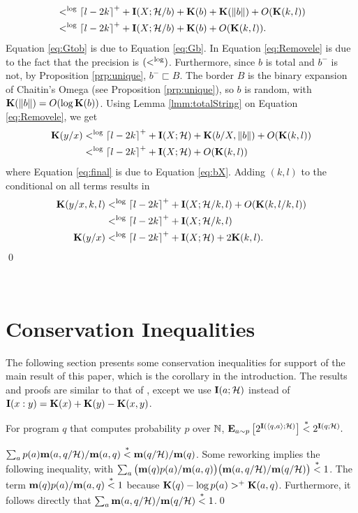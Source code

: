 \documentclass[11pt]{article}\textwidth 6.5in\textheight 9in
\begin{document}
\begin{prf}
\begin{align}
	& <^{\log} {\lceil l-2k\rceil}^++{\mathbf I}(X;{\mathcal H}/b)+{\mathbf K}(b)+{\mathbf K}(\|b\|)+O({\mathbf K}(k,l))\\
	\label{eq:Removele}
	& <^{\log} {\lceil l-2k\rceil}^++{\mathbf I}(X;{\mathcal H}/b)+{\mathbf K}(b)+O({\mathbf K}(k,l)).
	\end{align}
	Equation \ref{eq:Gtob} is due to Equation \ref{eq:Gb}. In Equation \ref{eq:Removele} is due to the fact that the precision is  $(<^{\log})$. Furthermore, since $b$ is total and $b^-$ is not, by Proposition \ref{prp:unique}, $b^-\sqsubset B$. The border $B$ is the binary expansion of Chaitin's Omega (see Proposition \ref{prp:unique}), so $b$ is random, with ${\mathbf K}(\|b\|)=O(\log {\mathbf K}(b))$. Using Lemma \ref{lmm:totalString} on Equation \ref{eq:Removele}, we get
\begin{align}
\nonumber
{\mathbf K}(y/x)& <^{\log} {\lceil l-2k\rceil}^++{\mathbf I}(X;{\mathcal H})+{\mathbf K}(b/X,\|b\|)+O({\mathbf K}(k,l))\\
\label{eq:final}
	 & <^{\log} {\lceil l-2k\rceil}^++{\mathbf I}(X;{\mathcal H})+O({\mathbf K}(k,l))
	 \end{align}
	 where Equation \ref{eq:final} is due to Equation \ref{eq:bX}. Adding $( k,l)$ to the conditional on all terms results in
	 \begin{align*}
	{\mathbf K}(y/x,k,l) &<^{\log}{\lceil l-2k\rceil}^++{\mathbf I}(X;{\mathcal H}/k,l)+O({\mathbf K}(k,l/k,l))\\
	&<^{\log}{\lceil l-2k\rceil}^++{\mathbf I}(X;{\mathcal H}/k,l)\\
	{\mathbf K}(y/x) &<^{\log}{\lceil l-2k\rceil}^++{\mathbf I}(X;{\mathcal H})+2{\mathbf K}(k,l).
\end{align*}
\qed
\end{prf}$ $\\ \\
%

\appendix
\section{Conservation Inequalities}
\label{sec:cons}
The following section presents some conservation inequalities for support of the main result of this paper, which is the corollary in the introduction. The results and proofs are similar to that of \citep{Levin84}, except we use ${\mathbf I}(a;{\mathcal H})$ instead of ${\mathbf I}(x:y)={\mathbf K}(x)+{\mathbf K}(y)-{\mathbf K}(x,y)$.

\begin{thr}
For program $q$ that computes probability $p$ over $\mathbb{N}$, ${\mathbf E}_{a\sim p}\left[2^{{\mathbf I}(\langle q,a\rangle;{\mathcal H})}\right] \stackrel{\ast}{<} 2^{{\mathbf I}(q;{\mathcal H})}.$
\end{thr}
\begin{prf}
$\sum_ap(a){\mathbf {m}}(a,q/{\mathcal H})/{\mathbf {m}}(a,q) \stackrel{\ast}{<} {\mathbf {m}}(q/{\mathcal H})/{\mathbf {m}}(q)$. Some reworking implies the following inequality, with $\sum_a\big({\mathbf {m}}(q)p(a)/{\mathbf {m}}(a,q)\big)\big({\mathbf {m}}(a,q/{\mathcal H})/{\mathbf {m}}(q/{\mathcal H})\big)\stackrel{\ast}{<} 1$. The term ${\mathbf {m}}(q)p(a)/{\mathbf {m}}(a,q)\stackrel{\ast}{<} 1$ because ${\mathbf K}(q)-\log p(a)>^+ {\mathbf K}(a,q)$. Furthermore, it follows directly that $\sum_a {\mathbf {m}}(a,q/{\mathcal H})/{\mathbf {m}}(q/{\mathcal H})\stackrel{\ast}{<} 1$.\qed
\end{prf}
\end{document}
